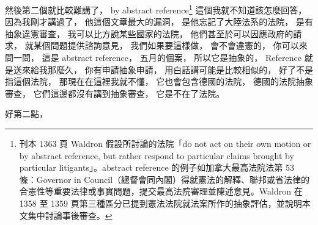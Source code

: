 \hypertarget{w06:cue:1636}{}然後第二個就比較難講了，
\hypertarget{w06:cue:1637}{}by abstract reference\footnote{刊本 1363 頁 Waldron 假設所討論的法院「do not act on their own motion or by abstract reference, but rather respond to particular claims brought by particular litigants」。abstract reference 的例子如加拿大最高法院法第 53 條：Governor in Council（總督會同內閣）得就憲法的解釋、聯邦或省法律的合憲性等重要法律或事實問題，提交最高法院審理並陳述意見。Waldron 在 1358 至 1359 頁第三種區分已提到憲法法院就法案所作的抽象評估，並說明本文集中討論事後審查。}
\hypertarget{w06:cue:1638}{}這個我就不知道該怎麼回答，
\hypertarget{w06:cue:1639}{}因為我剛才講過了，
\hypertarget{w06:cue:1640}{}他這個文章最大的漏洞，
\hypertarget{w06:cue:1641}{}是他忘記了大陸法系的法院，
\hypertarget{w06:cue:1642}{}是有抽象違憲審查，
\hypertarget{w06:cue:1643}{}我可以比方說某些國家的法院，
\hypertarget{w06:cue:1644}{}他們甚至於可以因應政府的請求，
\hypertarget{w06:cue:1645}{}就某個問題提供諮詢意見，
\hypertarget{w06:cue:1646}{}我們如果要這樣做，
\hypertarget{w06:cue:1647}{}會不會違憲的，
\hypertarget{w06:cue:1648}{}你可以來問一問，
\hypertarget{w06:cue:1649}{}這是 abstract reference，
\hypertarget{w06:cue:1650}{}五月的個案，
\hypertarget{w06:cue:1651}{}所以它是抽象的，
\hypertarget{w06:cue:1652}{}Reference 就是送來給我那麼久，
\hypertarget{w06:cue:1653}{}你有申請抽象申請，
\hypertarget{w06:cue:1654}{}用白話講可能是比較相似的，
\hypertarget{w06:cue:1655}{}好了不是指這個法院，
\hypertarget{w06:cue:1656}{}那現在在這裡我就不懂，
\hypertarget{w06:cue:1657}{}它也會包含德國的法院，
\hypertarget{w06:cue:1658}{}德國的法院抽象審查，
\hypertarget{w06:cue:1659}{}它們這邊都沒有講到抽象審查，
\hypertarget{w06:cue:1660}{}它是不在了法院。

\hypertarget{w06:cue:1661}{}好第二點，

